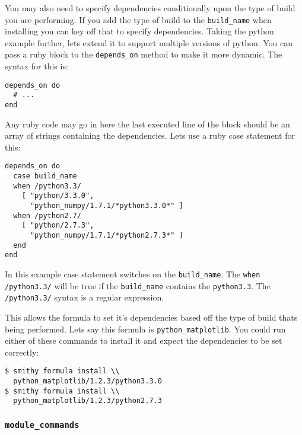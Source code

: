 \documentclass{acm_proc_article-sp}
\begin{document}
You may also need to specify dependencies conditionally upon the type of build
you are performing. If you add the type of build to the \texttt{build\_name}
when installing you can key off that to specify dependencies. Taking the python
example further, lets extend it to support multiple versions of python. You can
pass a ruby block to the \texttt{depends\_on} method to make it more dynamic.
The syntax for this is:

\begin{quoting}
\begin{verbatim}
depends_on do
  # ...
end
\end{verbatim}
\end{quoting}

Any ruby code may go in here the last executed line of the block should be an
array of strings containing the dependencies. Lets use a ruby case statement
for this:

\begin{quoting}
\begin{verbatim}
depends_on do
  case build_name
  when /python3.3/
    [ "python/3.3.0",
      "python_numpy/1.7.1/*python3.3.0*" ]
  when /python2.7/
    [ "python/2.7.3",
      "python_numpy/1.7.1/*python2.7.3*" ]
  end
end
\end{verbatim}
\end{quoting}

In this example case statement switches on the \texttt{build\_name}. The
\texttt{when /python3.3/} will be true if the \texttt{build\_name} contains the
\texttt{python3.3}. The
\texttt{/python3.3/} syntax is a regular expression.

This allows the formula to set it's dependencies based off the type of build
thats being performed. Lets say this formula is \texttt{python\_matplotlib}. You could
run either of these commands to install it and expect the dependencies to be set
correctly:

\begin{quoting}
\begin{verbatim}
$ smithy formula install \\
  python_matplotlib/1.2.3/python3.3.0
$ smithy formula install \\
  python_matplotlib/1.2.3/python2.7.3
\end{verbatim}
\end{quoting}

\subsubsection{\texttt{module\_commands}}
\end{document}
